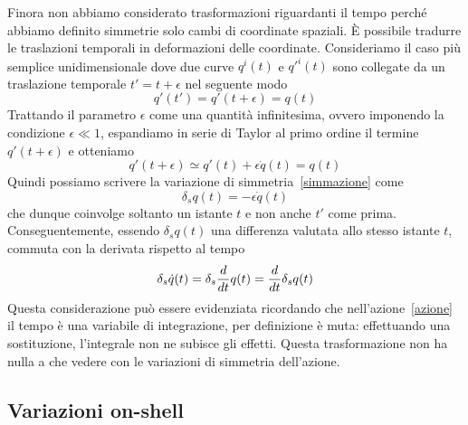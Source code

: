     Finora non abbiamo considerato trasformazioni riguardanti il tempo perché abbiamo definito simmetrie solo cambi di coordinate spaziali. È possibile tradurre le traslazioni temporali in deformazioni delle coordinate. Consideriamo il caso più semplice unidimensionale dove due curve $q^i(t)$ e $q'^i(t)$ sono collegate da un traslazione temporale $t' = t + \epsilon$ nel seguente modo 
    \begin{equation*}
        q'(t') = q'(t + \epsilon) = q(t)
    \end{equation*} 
    Trattando il parametro $\epsilon$ come una quantità infinitesima, ovvero imponendo la condizione $\epsilon \ll 1$, espandiamo in serie di Taylor al primo ordine il termine $q'(t + \epsilon)$ e otteniamo
    \begin{equation*}
        q'(t + \epsilon) \simeq q'(t) + \epsilon \dot q(t) = q(t)
    \end{equation*}     
    Quindi possiamo scrivere la variazione di simmetria~\eqref{simmazione} come 
    \begin{equation}\label{simmtempo}
        \delta_s q(t) = - \epsilon \dot q(t)
    \end{equation}
    che dunque coinvolge soltanto un istante $t$ e non anche $t'$ come prima. Conseguentemente, essendo $\delta_s q(t)$ una differenza valutata allo stesso istante $t$, commuta con la derivata rispetto al tempo
    \begin{equation}\label{commutatore}
        \delta_s \dot q(t) = \delta_s \frac{d}{dt} q(t) = \frac{d}{dt} \delta_s q(t) 
    \end{equation}
    Questa considerazione può essere evidenziata ricordando che nell'azione~\eqref{azione} il tempo è una variabile di integrazione, per definizione è muta: effettuando una sostituzione, l'integrale non ne subisce gli effetti. Questa trasformazione non ha nulla a che vedere con le variazioni di simmetria dell'azione. 

\subsection{Variazioni on-shell}

